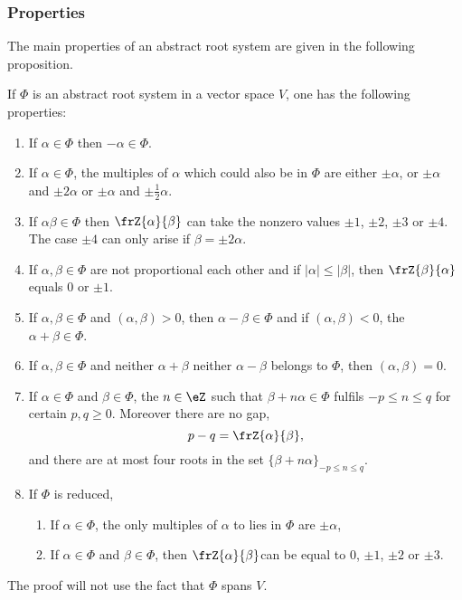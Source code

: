 \subsubsection{Properties}

The main properties of an abstract root system are given in the  following proposition.
\begin{proposition}     \label{PropPropAbstrRootviiiikl}
If $\Phi$ is an abstract root system in a vector space $V$, one has the following properties:

\begin{enumerate}
\item\label{enubi} If $\alpha\in\Phi$ then $-\alpha\in\Phi$.

\item\label{enubii} If $\alpha\in\Phi$, the multiples of $\alpha$ which could also be in $\Phi$ are either $\pm\alpha$, or $\pm\alpha$ and $\pm 2\alpha$ or $\pm\alpha$ and $\pm\frac{1}{2}\alpha$.

\item\label{enubiii} If $\alpha\beta\in\Phi$ then $\frZ{\alpha}{\beta}$ can take the nonzero values $\pm 1$, $\pm 2$, $\pm 3$ or $\pm 4$. The case $\pm 4$ can only arise if $\beta=\pm 2\alpha$.

\item\label{enubiv} If $\alpha,\beta\in\Phi$ are not proportional each other and if $|\alpha|\leq|\beta|$, then $\frZ{\beta}{\alpha}$ equals $0$ or $\pm 1$.

\item\label{enubv} If $\alpha,\beta\in\Phi$ and $(\alpha,\beta)>0$, then $\alpha-\beta\in\Phi$ and if $(\alpha,\beta)<0$, the $\alpha+\beta\in\Phi$.

\item\label{enubvi} If $\alpha,\beta\in\Phi$ and neither $\alpha+\beta$ neither $\alpha-\beta$ belongs to $\Phi$, then $(\alpha,\beta)=0$.

\item\label{enubvii} If $\alpha\in\Phi$ and $\beta\in\Phi$, the $n\in\eZ$ such that $\beta+n\alpha\in\Phi$ fulfils $-p\leq n\leq q$ for certain $p,q\geq 0$. Moreover there are no gap,
\[
   p-q=\frZ{\alpha}{\beta},
\]
and there are at most four roots in the set $\{\beta+n\alpha\}_{-p\leq n\leq q}$.

\item\label{enubviii} If $\Phi$ is reduced, 

\begin{enumerate}
\item\label{enubviiia} If $\alpha\in\Phi$, the only multiples of $\alpha$ to lies in $\Phi$ are $\pm\alpha$,
\item\label{enubviiib} If $\alpha\in\Phi$ and $\beta\in\Phi$, then $\frZ{\alpha}{\beta}$can be equal to $0$, $\pm 1$, $\pm 2$ or $\pm 3$.
\end{enumerate}
\end{enumerate} \label{prop:Cartan_matr}
\end{proposition}
The proof will not use the fact that $\Phi$ spans $V$.

